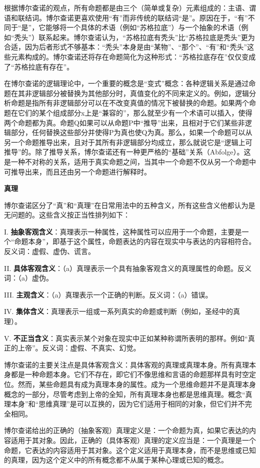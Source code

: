 根据博尔查诺的观点，所有命题都是由三个（简单或复杂）元素组成的：主语、谓语和联结词。博尔查诺更喜欢使用“有”而非传统的联结词“是”。原因在于，“有”不同于“是”，它能够将一个具体的术语（例如“苏格拉底”）与一个抽象的术语（例如“秃头”）联系起来。博尔查诺认为，“苏格拉底有秃头”比“苏格拉底是秃头”更为合适，因为后者形式不够基本：“秃头”本身是由“某物”、“那个”、“有”和“秃头”这些元素构成的。博尔查诺还将存在命题简化为这种形式：“苏格拉底存在”仅仅变成了“苏格拉底有存在”。

在博尔查诺的逻辑理论中，一个重要的概念是“变式”概念：各种逻辑关系是通过命题在其非逻辑部分被替换为其他部分时，真值变化的不同来定义的。例如，逻辑分析命题是指所有非逻辑部分可以在不改变真值的情况下被替换的命题。如果两个命题在它们的某个组成部分x上是“兼容的”，那么就至少有一个术语可以插入，使得两个命题都为真。命题Q如果可以从命题P中“推导”出来，且相对于它们某些非逻辑部分，任何替换这些部分并使得P为真也使Q为真。那么，如果一个命题可以从另一个命题推导出来，且对于其所有非逻辑部分均成立，那么就说它是“逻辑上可推导”的。除了推导关系，博尔查诺还有一种更严格的“基础”关系（Abfolge）。这是一种不对称的关系，适用于真实命题之间，当其中一个命题不仅从另一个命题中可推导出来，而且还由另一个命题进行解释时。

\textbf{真理}

博尔查诺区分了“真”和“真理”在日常用法中的五种含义，所有这些含义他都认为是无问题的。这些含义按正当性排列如下：

I. \textbf{抽象客观含义}：真理表示一种属性，这种属性可以应用于一个命题，主要是一个“命题本身”，即基于这个属性，命题表达的内容在现实中与表达的内容相符合。反义词：虚假、虚伪、谎言。

II. \textbf{具体客观含义}：（a）真理表示一个具有抽象客观含义的真理属性的命题。反义词：（a）虚伪。

III. \textbf{主观含义}：（a）真理表示一个正确的判断。反义词：（a）错误。

IV. \textbf{集体含义}：真理表示一组或一系列真实的命题或判断（例如，圣经中的真理）。

V. \textbf{不正当含义}：真实表示某个对象在现实中正如某种称谓所表明的那样。例如“真正的上帝”。反义词：虚假、不真实、幻觉。

博尔查诺的主要关注点是具体客观含义：具体客观的真理或真理本身。所有真理本身都是一种命题本身。它们不存在，即它们不像思维和言语的命题那样具有时空定位。然而，某些命题具有成为真理本身的属性。成为一个思维命题并不是真理本身概念的一部分，尽管考虑到上帝的全知，所有真理本身也都是思维真理。概念“真理本身”和“思维真理”是可以互换的，因为它们适用于相同的对象，但它们并不完全相同。

博尔查诺给出的正确的（抽象客观）真理定义是：一个命题为真，如果它表达的内容适用于其对象。因此，正确的（具体客观）真理的定义应当是：一个真理是一个命题，它表达的内容适用于其对象。这个定义适用于真理本身，而不是思维或已知的真理，因为这个定义中的所有概念都不从属于某种心理或已知的概念。


